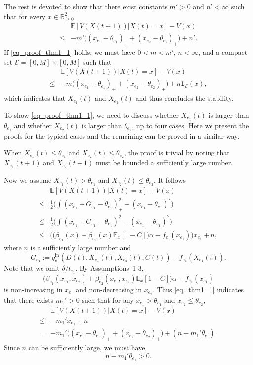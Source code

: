 The rest is devoted to show that there exist constants $m'>0$ and $n'<\infty$ such that for every $x\in\mathbb{R}_{\geq0}^2$
\begin{align}
 &\mathbb{E}[V(X(t+1))|X(t)=x] - V(x) \nonumber \\
 \leq & -m' \Big((x_{e_1}-\theta_{e_1})_+ + (x_{e_2}-\theta_{e_2})_+\Big) + n'.  \label{eq_proof_thm1_1}  
\end{align}
If \eqref{eq_proof_thm1_1} holds, we must have $0<m<m'$, $n<\infty$, and a compact set $\mathcal{E}=[0, M]\times[0,M]$ such that
\begin{align}
 &\mathbb{E}[V(X(t+1))|X(t)=x] - V(x) \nonumber \\
 \leq & -m \Big((x_{e_1}-\theta_{e_1})_+ + (x_{e_2}-\theta_{e_2})_+\Big) + n\mathbf{1}_{\mathcal{E}}(x),  \label{eq_proof_thm1_2}  
\end{align}
which indicates that $X_{e_1}(t)$ and $X_{e_2}(t)$ and thus concludes the stability.

To show \eqref{eq_proof_thm1_1}, we need to discuss whether $X_{e_1}(t)$ is larger than $\theta_{e_1}$ and whether $X_{e_2}(t)$ is larger than $\theta_{e_2}$, up to four cases. Here we present the proofs for the typical cases and the remaining can be proved in a similar way.

When $X_{e_1}(t)\leq\theta_{e_1}$ and $X_{e_2}(t)\leq\theta_{e_2}$, the proof is trivial by noting that $X_{e_1}(t+1)$ and $X_{e_2}(t+1)$ must be bounded a sufficiently large number.


Now we assume $X_{e_1}(t)>\theta_{e_1}$ and $X_{e_2}(t)\leq\theta_{e_2}$. It follows
\begin{align*}
    &\mathbb{E}[V(X(t+1))|X(t)=x]-V(x) \\
    \leq& \frac{1}{2}\Big(\int (x_{e_1}+G_{e_1}-\theta_{e_1})_+^2 - (x_{e_1}-\theta_{e_1})^2\Big)  \\
    \leq& \frac{1}{2}\Big(\int (x_{e_1}+G_{e_1}-\theta_{e_1})^2 - (x_{e_1}-\theta_{e_1})^2\Big) \\
    \leq& \Big(\Big(\beta_{e_1}(x) + \beta_{e_2}(x)\mathbb{E}_x[1-C]\Big)\alpha -f_{e_1}(x_{e_1}) \Big)x_{e_1} + n,
\end{align*}
where $n$ is a sufficiently large number and
\begin{equation}
    G_{e_1}:=q_{e_1}^{\mathrm{in}}(D(t), X_{e_1}(t), X_{e_2}(t), C(t)) - f_{e_1}(X_{e_1}(t)). \label{eq_G_e1}
\end{equation}
Note that we omit $\delta/l_{e_1}$. By Assumptions~1-3,
$$\Big(\beta_{e_1}(x_{e_1}, x_{e_2}) + \beta_{e_2}(x_{e_1}, x_{e_2})\mathbb{E}_x[1-C]\Big)\alpha -f_{e_1}(x_{e_1})$$
is non-increasing in $x_{e_1}$ and non-decreasing in $x_{e_2}$. Thus \eqref{eq_thm1_1} indicates that there exists $m_1'>0$ such that for any $x_{e_1}>\theta_{e_1}$ and $x_{e_2}\leq\theta_{e_2}$,
\begin{align*}
    &\mathbb{E}[V(X(t+1))|X(t)=x]-V(x) \\
    \leq& -m_1'x_{e_1}+n \\
    =& -m_1'\Big((x_{e_1}-\theta_{e_1})_++(x_{e_2}-\theta_{e_2})_+\Big) + (n-m_1'\theta_{e_1}).
\end{align*}
Since $n$ can be sufficiently large, we must have 
$$n-m_1'\theta_{e_1}>0.$$

